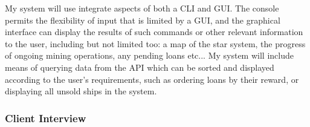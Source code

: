 My system will use integrate aspects of both a CLI and GUI. The console permits the flexibility of input that is limited by a GUI, and the graphical interface can display the results of such commands or other relevant information to the user, including but not limited too: a map of the star system, the progress of ongoing mining operations, any pending loans etc... My system will include means of querying data from the API which can be sorted and displayed according to the user's requirements, such as ordering loans by their reward, or displaying all unsold ships in the system. 

\subsubsection{Client Interview}